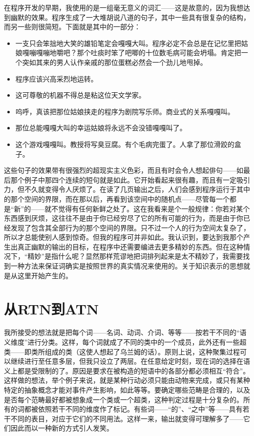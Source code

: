 在程序开发的早期，我使用的是一组毫无意义的词汇——这是故意的，因为我想达到幽默的效果。程序生成了一大堆胡说八道的句子，其中一些具有很复杂的结构，而另一些则很简短。下面就是其中的一部分：
\begin{itemize}
\item 一支只会笨拙地大笑的雄铅笔定会嘎嘎大叫。程序必定不会总是在记忆里把姑娘嘎嘣嘎嘣地嚼吧？那个吐痰时笨了吧唧的十位数毛病可能会坍塌。肯定把一个突如其来的男人认作亲戚的那位蛋糕必然会一个劲儿地甩掉。
\item 程序应该兴高采烈地运转。
\item 这可尊敬的机器不得总是粘这位天文学家。
\item 呜呼，真该把那位姑娘挟走的程序为剧院写乐师。商业式的关系嘎嘎叫。
\item 那位总能嘎嘎大叫的幸运姑娘将永远不会没错嘎嘎叫了。
\item 这个游戏嘎嘎叫。教授将写臭豆腐。有个毛病完蛋了。人拿了那位滑跤的盒子。
\end{itemize}
这些句子的效果带有很强烈的超现实主义色彩，而且有时会令人想起俳句——如最后那个例子中那四个连续的短句就是如此。它开始看起来很有趣，而且有一定吸引力，但不久就变得令人厌烦了。在读了几页输出之后，人们会感到程序运行于其中的那个空间的界限，而在那以后，再看到该空间中的随机点——尽管每一个都是“新”的——就不觉得有任何新鲜之处了。这在我看来是个一般规律：你若对某个东西感到厌烦，这往往不是由于你已经穷尽了它的所有可能的行为，而是由于你已经发现了包含其全部行为的那个空间的界限。只不过一个人的行为空间太复杂了，所以才总能使别人感到惊奇。但我的程序可并非如此。我认识到，要达到我那个产生出真正幽默的输出的目标，在程序中还需要编进去更多精妙的东西。但在这种情况下，“精妙”是指什么呢？显然那样荒谬地把词排列起来是太不精妙了，我需要找到一种方法来保证词确实是按照世界的真实情况来使用的。关于知识表示的思想就是从这里开始产生的。

\section{从RTN到ATN}

我所接受的想法就是把每个词——名词、动词、介词、等等——按若干不同的“语义维度”进行分类。这样，每个词就成了不同的类中的一个成员，此外还有一些超类——即类所组成的类（这使人想起了乌兰姆的话）。原则上说，这种聚集过程可以继续进行至任意多层，但我只设立了两层。在任意给定时刻，现在词的选择在语义上都是受限制的了。原因是要求在被构造的短语中的各部分都必须相互“符合”。这样做的想法，举个例子来说，就是某种行动必须只能由动物来完成，或只有某种特定的抽象概念才能对事件产生影响，如此等等。要确定哪些范畴是合理的，以及是否每个范畴最好都被想象成一个类或一个超类，这种判定过程是十分复杂的。所有的词都被依照若干不同的维度作了标记。有些词——“的”、“之中”等——具有若干不同的表目，对应于它们的不同用法。这样一来，输出就变得可理解多了——它们因此而以一种新的方式引人发笑。

